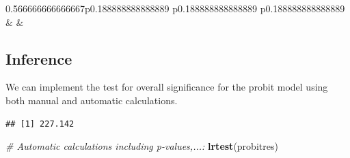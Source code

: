 \documentclass[]{book}
\newenvironment{Shaded}{\begin{snugshade}}{\end{snugshade}}
\newcommand{\CommentTok}[1]{\textcolor[rgb]{0.56,0.35,0.01}{\textit{#1}}}
\newcommand{\KeywordTok}[1]{\textcolor[rgb]{0.13,0.29,0.53}{\textbf{#1}}}
\newcommand{\NormalTok}[1]{#1}
\newcommand{\OperatorTok}[1]{\textcolor[rgb]{0.81,0.36,0.00}{\textbf{#1}}}
\newcommand{\StringTok}[1]{\textcolor[rgb]{0.31,0.60,0.02}{#1}}
\begin{document}
\begin{table}[h]
\begin{raggedright}
\begin{tabularx}{0.566666666666667\textwidth}{p{} p{} p{}}
 &
 &
 \tabularnewline[-0.5pt]


\end{tabularx}\par\end{raggedright}
\end{table}

\hypertarget{inference}{%
\subsection{Inference}\label{inference}}

We can implement the test for overall significance for the probit model using both manual and automatic calculations.

\begin{Shaded}
\end{Shaded}

\begin{verbatim}
## [1] 227.142
\end{verbatim}

\begin{Shaded}
\begin{Highlighting}[]
\CommentTok{# Automatic calculations including p-values,...:}
\KeywordTok{lrtest}\NormalTok{(probitres)}
\end{Highlighting}
\end{Shaded}

 
  \providecommand{\huxb}[2]{\arrayrulecolor[RGB]{#1}\global\arrayrulewidth=#2pt}
  \providecommand{\huxvb}[2]{\color[RGB]{#1}\vrule width #2pt}
  \providecommand{\huxtpad}[1]{\rule{0pt}{\baselineskip+#1}}
  \providecommand{\huxbpad}[1]{\rule[-#1]{0pt}{#1}}
\end{document}
